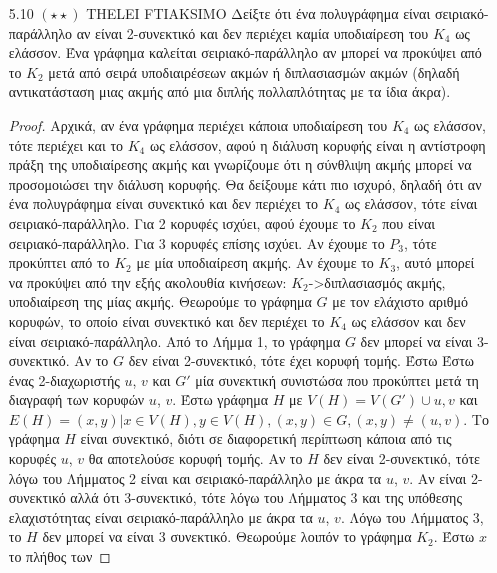 \documentclass[a4paper, oneside, 11pt]{article}
\begin{document}
\begin{enumerate}
\begin{proof}
      Όπου το 4ο βήμα προκύπτει από την ανισότητα Cauchy-Schwarz:

      \[ d(u_1)\cdot1 + d(u_2)\cdot2 + \ldots + d(u_n)\cdot1
         \leq (d^2(u_1) + \ldots + d^2(u_n)) \cdot (1 + \ldots + 1)
         = (d^2(u_1) + \ldots + d^2(u_n)) \cdot n \]

      \end{proof}

   \item[5.10 $(\star \star)$]
THELEI FTIAKSIMO
Δείξτε ότι ένα πολυγράφημα είναι σειριακό-παράλληλο αν είναι 2-συνεκτικό και δεν περιέχει καμία υποδιαίρεση του $K_4$ ως ελάσσον. Ένα γράφημα καλείται σειριακό-παράλληλο αν μπορεί
να προκύψει από το $K_2$ μετά από σειρά υποδιαιρέσεων ακμών ή διπλασιασμών ακμών (δηλαδή αντικατάσταση μιας ακμής από μια διπλής πολλαπλότητας με τα ίδια άκρα).
	\begin{proof}
Αρχικά, αν ένα γράφημα περιέχει κάποια υποδιαίρεση του $K_4$ ως ελάσσον, τότε περιέχει και το $K_4$ ως ελάσσον, αφού η διάλυση κορυφής είναι η αντίστροφη πράξη της υποδιαίρεσης ακμής και γνωρίζουμε
ότι η σύνθλιψη ακμής μπορεί να προσομοιώσει την διάλυση κορυφής.
Θα δείξουμε κάτι πιο ισχυρό, δηλαδή ότι αν ένα πολυγράφημα είναι συνεκτικό και δεν περιέχει το $K_4$ ως ελάσσον, τότε είναι σειριακό-παράλληλο.
Για 2 κορυφές ισχύει, αφού έχουμε το $K_2$ που είναι σειριακό-παράλληλο.
Για 3 κορυφές επίσης ισχύει. Αν έχουμε το $P_3$, τότε προκύπτει από το $K_2$ με μία υποδιαίρεση ακμής. Αν έχουμε το $K_3$, αυτό μπορεί να προκύψει από την εξής ακολουθία κινήσεων: 
$K_2$->διπλασιασμός ακμής, υποδιαίρεση της μίας ακμής.
Θεωρούμε το γράφημα $G$ με τον ελάχιστο αριθμό κορυφών, το οποίο είναι συνεκτικό και δεν περιέχει το $K_4$ ως ελάσσον και δεν είναι σειριακό-παράλληλο. Από το Λήμμα 1, το γράφημα $G$ δεν μπορεί
να είναι 3-συνεκτικό. Αν το $G$ δεν είναι 2-συνεκτικό, τότε έχει κορυφή τομής. Έστω
Έστω ένας 2-διαχωριστής $u$, $v$ και $G'$ μία συνεκτική συνιστώσα που προκύπτει μετά τη διαγραφή των κορυφών $u$, $v$. Έστω γράφημα $H$ με 
$V(H)=V(G')\cup {u,v}$ και $E(H) = {(x,y) | x\in V(H), y\in V(H), (x,y)\in G, (x,y)\neq (u,v)}$. Το γράφημα $H$ είναι συνεκτικό, διότι σε διαφορετική περίπτωση κάποια από τις κορυφές 
$u$, $v$ θα αποτελούσε κορυφή τομής. Αν το $H$ δεν είναι 2-συνεκτικό, τότε λόγω του Λήμματος 2 είναι και σειριακό-παράλληλο με άκρα τα $u$, $v$. Αν είναι 2-συνεκτικό αλλά ότι 3-συνεκτικό, τότε 
λόγω του Λήμματος 3 
και της υπόθεσης ελαχιστότητας είναι σειριακό-παράλληλο με άκρα τα $u$, $v$. Λόγω του Λήμματος 3, το $H$ δεν μπορεί να είναι 3 συνεκτικό. Θεωρούμε λοιπόν το γράφημα $Κ_2$. Έστω $x$ το πλήθος των

\end{proof}
\end{enumerate}
\end{document}
